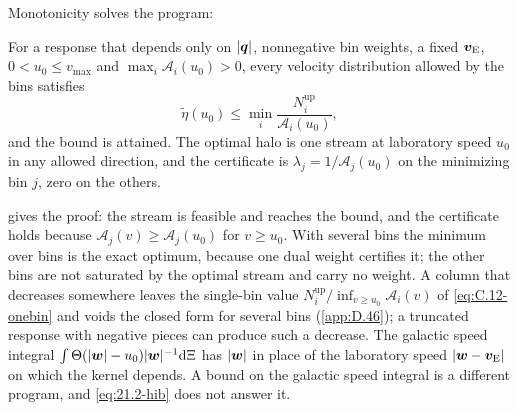 Monotonicity solves the program:
\begin{keyresult}
For a response that depends only on $|\bm{q}|$, nonnegative bin weights, a fixed $\bm{v}_{\mathrm{E}}$, $0 < u_0 \le v_{\mathrm{max}}$ and $\max_i\mathcal{A}_i(u_0) > 0$, every velocity distribution allowed by the bins satisfies
\begin{equation}
  \tilde\eta(u_0) \le \min_i\frac{N_i^{\mathrm{up}}}{\mathcal{A}_i(u_0)} ,
  \label{eq:21.2-hib}
\end{equation}
and the bound is attained. The optimal halo is one stream at laboratory speed $u_0$ in any allowed direction, and the certificate is $\lambda_j = 1/\mathcal{A}_j(u_0)$ on the minimizing bin $j$, zero on the others.
\end{keyresult}
\noindent {} gives the proof: the stream is feasible and reaches the bound, and the certificate holds because $\mathcal{A}_j(v) \ge \mathcal{A}_j(u_0)$ for $v \ge u_0$. With several bins the minimum over bins is the exact optimum, because one dual weight certifies it; the other bins are not saturated by the optimal stream and carry no weight. A column that decreases somewhere leaves the single-bin value $N_i^{\mathrm{up}}/\inf_{v \ge u_0}\mathcal{A}_i(v)$ of \cref{eq:C.12-onebin} and voids the closed form for several bins (\cref{app:D.46}); a truncated response with negative pieces can produce such a decrease. The galactic speed integral $\int\Theta(|\bm{w}| - u_0)|\bm{w}|^{-1}\mathrm{d}\Xi$ has $|\bm{w}|$ in place of the laboratory speed $|\bm{w} - \bm{v}_{\mathrm{E}}|$ on which the kernel depends. A bound on the galactic speed integral is a different program, and \cref{eq:21.2-hib} does not answer it.

